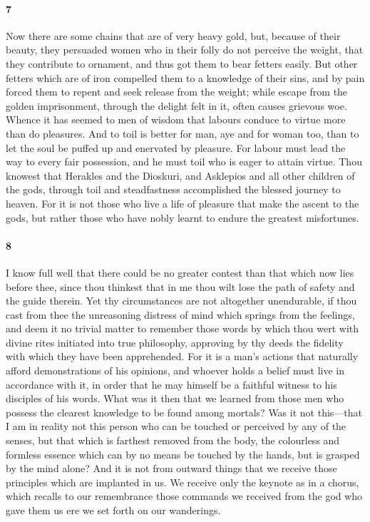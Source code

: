 \documentclass[12pt]{article}
\begin{document}
\paragraph{7} Now there are some chains that are of very heavy gold, but,
because of their beauty, they persuaded women who in their folly do not
perceive the weight, that they contribute to ornament, and thus got them to
bear fetters easily. But other fetters which are of iron compelled them to a
knowledge of their sins, and by pain forced them to repent and seek release
from the weight; while escape from the golden imprisonment, through the delight
felt in it, often causes grievous woe. Whence it has seemed to men of wisdom
that labours conduce to virtue more than do pleasures. And to toil is better
for man, aye and for woman too, than to let the soul be puffed up and enervated
by pleasure. For labour must lead the way to every fair possession, and he must
toil who is eager to attain virtue. Thou knowest that Herakles and the
Dioskuri, and Asklepios and all other children of the gods, through toil and
steadfastness accomplished the blessed journey to heaven. For it is not those
who live a life of pleasure that make the ascent to the gods, but rather those
who have nobly learnt to endure the greatest misfortunes.

\paragraph{8} I know full well that there could be no greater contest than that
which now lies before thee, since thou thinkest that in me thou wilt lose the
path of safety and the guide therein. Yet thy circumstances are not altogether
unendurable, if thou cast from thee the unreasoning distress of mind which
springs from the feelings, and deem it no trivial matter to remember those
words by which thou wert with divine rites initiated into true philosophy,
approving by thy deeds the fidelity with which they have been apprehended. For
it is a man's actions that naturally afford demonstrations of his opinions, and
whoever holds a belief must live in accordance with it, in order that he may
himself be a faithful witness to his disciples of his words. What was it then
that we learned from those men who possess the clearest knowledge to be found
among mortals? Was it not this---that I am in reality not this person who can
be touched or perceived by any of the senses, but that which is farthest
removed from the body, the colourless and formless essence which can by no
means be touched by the hands, but is grasped by the mind alone? And it is not
from outward things that we receive those principles which are implanted in us.
We receive only the keynote as in a chorus, which recalls to our remembrance
those commands we received from the god who gave them us ere we set forth on
our wanderings.
\end{document}
